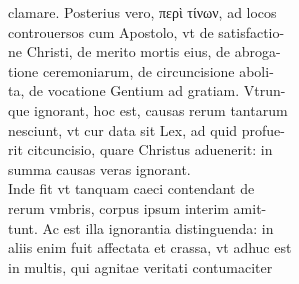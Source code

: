 \documentclass{article}
\begin{document}
\begin{pages}
                clamare. Posterius vero, περὶ τίνων, ad locos \\
                controuersos cum Apostolo, vt de satisfactio- \\
                ne Christi, de merito mortis eius, de abroga- \\
                tione ceremoniarum, de circuncisione aboli- \\
                ta, de vocatione Gentium ad gratiam. Vtrun- \\
                que ignorant, hoc est, causas rerum tantarum \\
                nesciunt, vt cur data sit Lex, ad quid profue- \\
                rit citcuncisio, quare Christus aduenerit: in \\
                summa causas veras ignorant. \\
                Inde fit vt tanquam caeci contendant de \\
                rerum vmbris, corpus ipsum interim amit- \\
                tunt. Ac est illa ignorantia distinguenda: in \\
                aliis enim fuit affectata et crassa, vt adhuc est \\
                in multis, qui agnitae veritati contumaciter \\
                

\end{pages}
\end{document}
